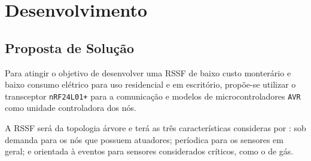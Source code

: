 \chapter{Desenvolvimento}
\label{cap:6}

\section{Proposta de Solução}
Para atingir o objetivo de desenvolver uma RSSF de baixo custo monterário e baixo consumo elétrico para uso
residencial e em escritório, propõe-se utilizar o transceptor \texttt{nRF24L01+} para a comunicação e modelos de
microcontroladores \texttt{AVR} como unidade controladora dos nós.

A RSSF será da topologia árvore e terá as três características consideras por
: sob demanda para os nós que possuem atuadores; períodica para os
sensores em geral; e orientada à eventos para sensores considerados críticos, como o de gás.
